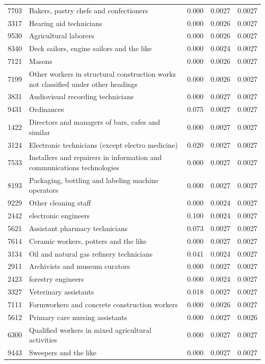 \begin{longtable}{p{}>{\raggedright\arraybackslash}p{}rrr}
7703 & Bakers, pastry chefs and confectioners & 0.000 & 0.0027 & 0.0027 \\
3317 & Hearing aid technicians & 0.000 & 0.0026 & 0.0027 \\
9530 & Agricultural laborers & 0.000 & 0.0026 & 0.0027 \\
8340 & Deck sailors, engine sailors and the like & 0.000 & 0.0024 & 0.0027 \\
7121 & Masons & 0.000 & 0.0026 & 0.0027 \\
7199 & Other workers in structural construction works not classified under other headings & 0.000 & 0.0026 & 0.0027 \\
3831 & Audiovisual recording technicians & 0.000 & 0.0027 & 0.0027 \\
9431 & Ordinances & 0.075 & 0.0027 & 0.0027 \\
1422 & Directors and managers of bars, cafes and similar & 0.000 & 0.0027 & 0.0027 \\
3124 & Electronic technicians (except electro medicine) & 0.020 & 0.0027 & 0.0027 \\
7533 & Installers and repairers in information and communications technologies & 0.000 & 0.0027 & 0.0027 \\
8193 & Packaging, bottling and labeling machine operators & 0.000 & 0.0027 & 0.0027 \\
9229 & Other cleaning staff & 0.000 & 0.0024 & 0.0027 \\
2442 & electronic engineers & 0.100 & 0.0024 & 0.0027 \\
5621 & Assistant pharmacy technicians & 0.073 & 0.0027 & 0.0027 \\
7614 & Ceramic workers, potters and the like & 0.000 & 0.0027 & 0.0027 \\
3134 & Oil and natural gas refinery technicians & 0.041 & 0.0024 & 0.0027 \\
2911 & Archivists and museum curators & 0.000 & 0.0027 & 0.0027 \\
2423 & forestry engineers & 0.000 & 0.0024 & 0.0027 \\
3327 & Veterinary assistants & 0.018 & 0.0027 & 0.0027 \\
7111 & Formworkers and concrete construction workers & 0.000 & 0.0026 & 0.0027 \\
5612 & Primary care nursing assistants & 0.000 & 0.0027 & 0.0026 \\
6300 & Qualified workers in mixed agricultural activities & 0.000 & 0.0027 & 0.0027 \\
9443 & Sweepers and the like & 0.000 & 0.0027 & 0.0027 \\

\end{longtable}
